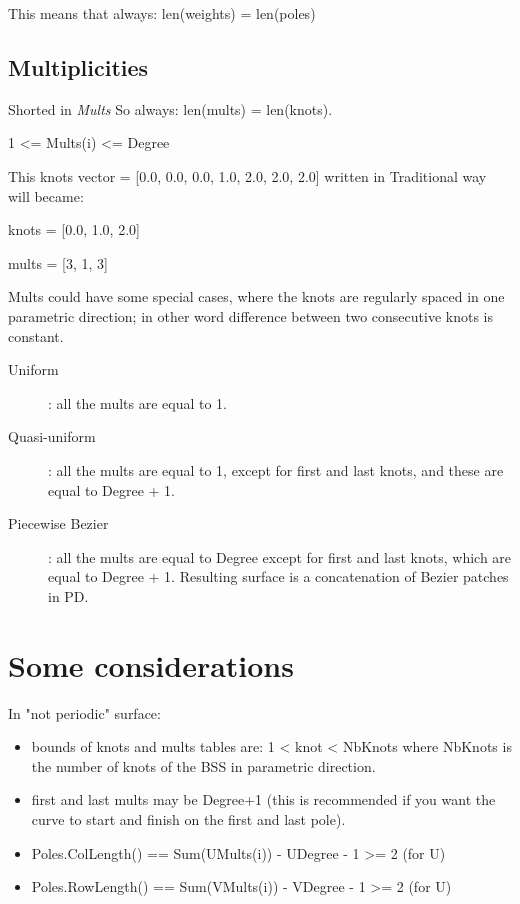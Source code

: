 \documentclass[a4paper]{article}
\begin{document}
This means that always: len(weights) = len(poles)


\subsection{Multiplicities}
Shorted in \emph{Mults}  
So always: len(mults) = len(knots).

1 <= Mults(i) <= Degree

This knots vector = [0.0, 0.0, 0.0, 1.0, 2.0, 2.0, 2.0] written in Traditional way will became:

\bigskip
knots = [0.0, 1.0, 2.0]
\bigskip

mults = [3, 1, 3]
\bigskip

Mults could have some special cases, where the knots are regularly spaced in one parametric direction; in other word difference between two consecutive knots is constant.

\begin{description}
  \item[Uniform]: all the mults are equal to 1.
  \item[Quasi-uniform]: all the mults are equal to 1, except for first and last knots, and these are equal to Degree + 1.
  \item[Piecewise Bezier]: all the mults are equal to Degree except for first and last knots, which are equal to Degree + 1. Resulting surface is a concatenation of Bezier patches in PD.
\end{description}


\section{Some considerations}

In "not periodic" surface:

\begin{itemize}
  \item bounds of knots and mults tables are:  1 < knot < NbKnots
where NbKnots is the number of knots of the BSS in parametric
direction.
  \item first and last mults may be Degree+1 (this is recommended if you
want the curve to start and finish on the first and last pole).
  \item Poles.ColLength() == Sum(UMults(i)) - UDegree - 1 >= 2 (for U)
  \item Poles.RowLength() == Sum(VMults(i)) - VDegree - 1 >= 2 (for U)
\end{itemize}
\end{document}
